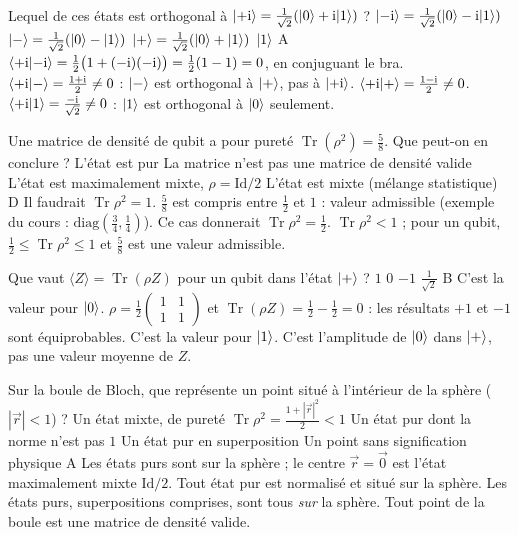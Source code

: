   {Lequel de ces états est orthogonal à $|{+}\mathrm{i}\rangle=\frac{1}{\sqrt2}(|0\rangle+\mathrm{i}|1\rangle)$ ?}
  {$|{-}\mathrm{i}\rangle=\frac{1}{\sqrt2}(|0\rangle-\mathrm{i}|1\rangle)$}
  {$|-\rangle=\frac{1}{\sqrt2}(|0\rangle-|1\rangle)$}
  {$|+\rangle=\frac{1}{\sqrt2}(|0\rangle+|1\rangle)$}
  {$|1\rangle$}
  {A}
\qcmx
  {$\langle {+}\mathrm{i}|{-}\mathrm{i}\rangle=\frac12\big(1+(-\mathrm{i})(-\mathrm{i})\big)=\frac12(1-1)=0$, en conjuguant le bra.}
  {$\langle {+}\mathrm{i}|-\rangle=\frac{1+\mathrm{i}}{2}\neq0$ : $|-\rangle$ est orthogonal à $|+\rangle$, pas à $|{+}\mathrm{i}\rangle$.}
  {$\langle {+}\mathrm{i}|+\rangle=\frac{1-\mathrm{i}}{2}\neq0$.}
  {$\langle {+}\mathrm{i}|1\rangle=\frac{-\mathrm{i}}{\sqrt2}\neq0$ : $|1\rangle$ est orthogonal à $|0\rangle$ seulement.}

  {Une matrice de densité de qubit a pour pureté $\operatorname{Tr}(\rho^2)=\frac58$. Que peut-on en conclure ?}
  {L'état est pur}
  {La matrice n'est pas une matrice de densité valide}
  {L'état est maximalement mixte, $\rho=\mathrm{Id}/2$}
  {L'état est mixte (mélange statistique)}
  {D}
\qcmx
  {Il faudrait $\operatorname{Tr}\rho^2=1$.}
  {$\frac58$ est compris entre $\frac12$ et $1$ : valeur admissible (exemple du cours : $\mathrm{diag}(\frac34,\frac14)$).}
  {Ce cas donnerait $\operatorname{Tr}\rho^2=\frac12$.}
  {$\operatorname{Tr}\rho^2<1$ ; pour un qubit, $\frac12\leq\operatorname{Tr}\rho^2\leq1$ et $\frac58$ est une valeur admissible.}

  {Que vaut $\langle Z\rangle=\operatorname{Tr}(\rho Z)$ pour un qubit dans l'état $|+\rangle$ ?}
  {$1$}
  {$0$}
  {$-1$}
  {$\frac{1}{\sqrt2}$}
  {B}
\qcmx
  {C'est la valeur pour $|0\rangle$.}
  {$\rho=\frac12\begin{pmatrix}1&1\\1&1\end{pmatrix}$ et $\operatorname{Tr}(\rho Z)=\frac12-\frac12=0$ : les résultats $+1$ et $-1$ sont équiprobables.}
  {C'est la valeur pour $|1\rangle$.}
  {C'est l'amplitude de $|0\rangle$ dans $|+\rangle$, pas une valeur moyenne de $Z$.}

  {Sur la boule de Bloch, que représente un point situé à l'intérieur de la sphère ($|\vec r|<1$) ?}
  {Un état mixte, de pureté $\operatorname{Tr}\rho^2=\frac{1+|\vec r|^2}{2}<1$}
  {Un état pur dont la norme n'est pas $1$}
  {Un état pur en superposition}
  {Un point sans signification physique}
  {A}
\qcmx
  {Les états purs sont sur la sphère ; le centre $\vec r=\vec0$ est l'état maximalement mixte $\mathrm{Id}/2$.}
  {Tout état pur est normalisé et situé sur la sphère.}
  {Les états purs, superpositions comprises, sont tous \emph{sur} la sphère.}
  {Tout point de la boule est une matrice de densité valide.}

